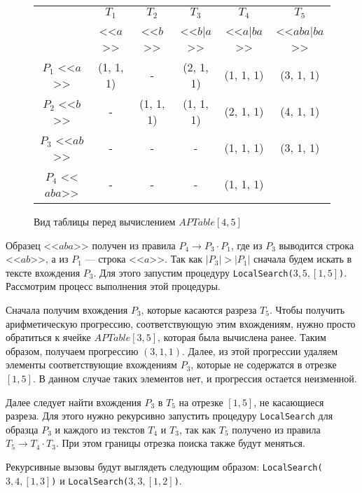 \documentclass[14pt]{article}
\begin{document}
\begin{figure}[H]
    \begin{center}
        \begin{tabular}{ | c | c | c | c | c | c |}

        \hline
              & $T_1$ & $T_2$ & $T_3$ & $T_4$ & $T_5$ \\
              & <<$a$>> & <<$b$>> & <<$b|a$>> & <<$a|ba$>> & <<$aba|ba$>> \\      
        \hline
        $P_1$ <<$a$>> & (1, 1, 1) & - & (2, 1, 1) & (1, 1, 1) & (3, 1, 1) \\
        \hline
        $P_2$ <<$b$>> & - & (1, 1, 1) & (1, 1, 1) & (2, 1, 1) & (4, 1, 1) \\
        \hline
        $P_3$ <<$ab$>> & - & - & - & (1, 1, 1) & (3, 1, 1)\\
        \hline
        $P_4$ <<$aba$>> & - & - & - & (1, 1, 1) & \\
        \hline
        \end{tabular}
    \end{center}
    \caption{Вид таблицы перед вычислением $APTable[4, 5]$}
    \label{ex2}
\end{figure}

Образец <<$aba$>> получен из правила $P_4 \to P_3\cdot P_1$, где из $P_3$ выводится строка <<$ab$>>,
а из $P_1$ --- строка <<$a$>>. Так как $|P_3| > |P_1|$ сначала будем искать в тексте вхождения $P_3$.
Для этого запустим процедуру \texttt{LocalSearch($3, 5, [1, 5]$)}.
Рассмотрим процесс выполнения этой процедуры.

Сначала получим вхождения $P_3$, которые касаются разреза $T_5$. Чтобы получить арифметическую прогрессию,
соответствующую этим вхождениям, нужно просто обратиться к ячейке $APTable[3, 5]$, которая была вычислена
ранее. Таким образом, получаем прогрессию $(3, 1, 1)$. Далее, из этой прогрессии удаляем элементы соответствующие вхождениям $P_3$, которые не содержатся в отрезке $[1, 5]$. 
В данном случае таких элементов нет, и прогрессия остается неизменной.

Далее следует найти вхождения $P_3$ в $T_5$ на отрезке $[1, 5]$, не касающиеся разреза.
Для этого нужно рекурсивно запустить процедуру \texttt{LocalSearch} для образца $P_3$ и каждого из текстов $T_4$ и $T_3$, так как $T_5$ получено из правила $T_5 \to T_4\cdot T_3$. При этом границы отрезка поиска также будут меняться.

Рекурсивные вызовы будут выглядеть следующим образом: \texttt{LocalSearch($3, 4, [1, 3]$)} и 
\texttt{LocalSearch($3, 3, [1, 2]$)}.
\end{document}
